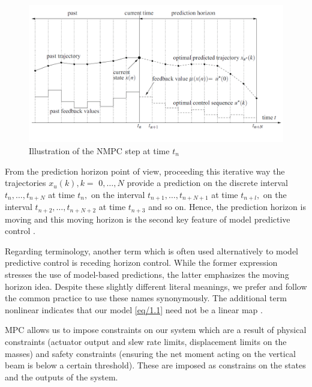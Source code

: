 \documentclass{UoNMCHA}
\numberwithin{equation}{section}
\begin{document}
	\begin{figure}[H]
		\begin{center}
			\includegraphics[width=1\linewidth]{figs/Picture7}
			\caption{Illustration of the NMPC step at time $ t_n $ \cite{larsgrune_2017_nonlinear}}
			\label{figs/Picture7}
		\end{center}
	\end{figure}
	
	
	From the prediction horizon point of view, proceeding this iterative way the trajectories $x_{u}(k), k=$
	$0, \ldots, N$ provide a prediction on the discrete interval $t_{n}, \ldots, t_{n+N}$ at time $t_{n},$ on the interval
	$t_{n+1}, \ldots, t_{n+N+1}$ at time $t_{n+l},$ on the interval $t_{n+2}, \ldots, t_{n+N+2}$ at time $t_{n+3}$ and so on. Hence, the
	prediction horizon is moving and this moving horizon is the second key feature of model predictive
	control \cite{larsgrune_2017_nonlinear}.
	
	Regarding terminology, another term which is often used alternatively to model predictive control is
	receding horizon control. While the former expression stresses the use of model-based predictions, the
	latter emphasizes the moving horizon idea. Despite these slightly different literal meanings, we prefer
	and follow the common practice to use these names synonymously. The additional term nonlinear
	indicates that our model \ref{eq/1.1} need not be a linear map \cite{larsgrune_2017_nonlinear}.\par
	
		MPC allows us to impose constraints on our system which are a result of physical constraints (actuator output and slew rate limits, displacement limits on the masses) and safety constraints (ensuring the net moment acting on the vertical beam is below a certain threshold). These are imposed as constrains on the states and the outputs of the system. 
	\newpage
\end{document}
